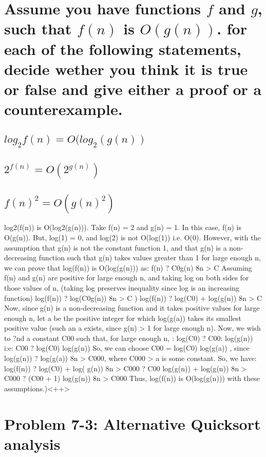 \documentclass[titlepage]{article}\usepackage[]{graphicx}\usepackage[]{color}
\begin{document}
\section{ Assume you have functions $f$ and $g$, such that $f(n)$ is $O(g(n))$.
  for each of the following statements, decide wether you think it is true or false and give
either a proof or a counterexample. }

\subsection{ $log_2f(n) = O(log_2(g(n))$}



\subsection{ $2^{ f(n) } = O(2^{ g(n) })$}

\subsection{$  f(n)^2 = O(g(n)^2)$}


log2(f(n)) is O(log2(g(n))).
Take f(n) = 2 and g(n) = 1. In this case, f(n) is O(g(n)). But, log(1) = 0, and
log(2) is not O(log(1)) i.e. O(0).
However, with the assumption that g(n) is not the constant function 1, and that
g(n) is a non-decreasing function such that g(n) takes values greater than 1
for large
enough n, we can prove that log(f(n)) is O(log(g(n))) as:
f(n) ? C0g(n) 8n > C
Assuming f(n) and g(n) are positive for large enough n, and taking log on both
sides for those values of n, (taking log preserves inequality since log is an
increasing
function)
log(f(n)) ? log(C0g(n)) 8n > C
) log(f(n)) ? log(C0) + log(g(n)) 8n > C
Now, since g(n) is a non-decreasing function and it takes positive values for
large
enough n, let a be the positive integer for which log(g(a)) takes its smallest
positive
value (such an a exists, since g(n) > 1 for large enough n). Now, we wish to
?nd a
constant C00 such that, for large enough n, :
log(C0) ? C00: log(g(n))
i:e: C00 ?
log(C0)
log(g(n))
So, we can choose C00 = log(C0)
log(g(a)) , since log(g(n)) ? log(g(a)) 8n > C000, where
C000 > a is some constant. So, we have:
log(f(n)) ? log(C0) + log\left( g(n)) 8n > C000
? C00 log(g(n)) + log(g(n)) 8n > C000
? (C00 + 1) log(g(n)) 8n > C000
Thus, log(f(n)) is O(log(g(n))) with these assumptions.\right)<++>




\section{ Problem 7-3: Alternative Quicksort analysis}
\end{document}
